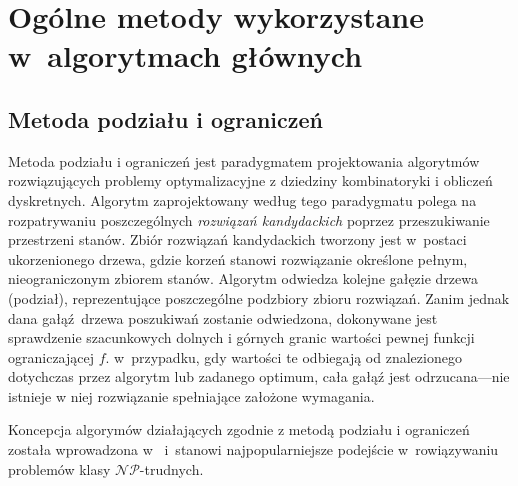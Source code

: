 \section{Ogólne metody wykorzystane w~algorytmach głównych}\label{s_methods}

\subsection{Metoda podziału i ograniczeń}\label{ss_branch_and_bound}
\par{
  Metoda podziału i ograniczeń jest paradygmatem projektowania algorytmów
  rozwiązujących problemy optymalizacyjne z dziedziny kombinatoryki i obliczeń
  dyskretnych. 
  Algorytm zaprojektowany według tego paradygmatu polega na rozpatrywaniu
  poszczególnych \emph{rozwiązań kandydackich} poprzez przeszukiwanie
  przestrzeni stanów.
  Zbiór rozwiązań kandydackich tworzony jest w~postaci ukorzenionego drzewa,
  gdzie korzeń stanowi rozwiązanie określone pełnym, nieograniczonym zbiorem
  stanów.
  Algorytm odwiedza kolejne gałęzie drzewa (podział), reprezentujące poszczególne
  podzbiory zbioru rozwiązań.
  Zanim jednak dana gałąź~drzewa poszukiwań zostanie odwiedzona, dokonywane jest
  sprawdzenie szacunkowych dolnych i górnych granic wartości pewnej funkcji 
  ograniczającej $f$.
  w~przypadku, gdy wartości te odbiegają od znalezionego dotychczas przez
  algorytm lub zadanego optimum, cała gałąź jest odrzucana---nie istnieje w
  niej rozwiązanie spełniające założone wymagania. 
}
\par{
  Koncepcja algorymów działających zgodnie z metodą podziału i ograniczeń
  została wprowadzona w~\cite{land60} i~stanowi najpopularniejsze podejście
  w~rowiązywaniu problemów klasy $\mathcal{NP}$-trudnych.
}
